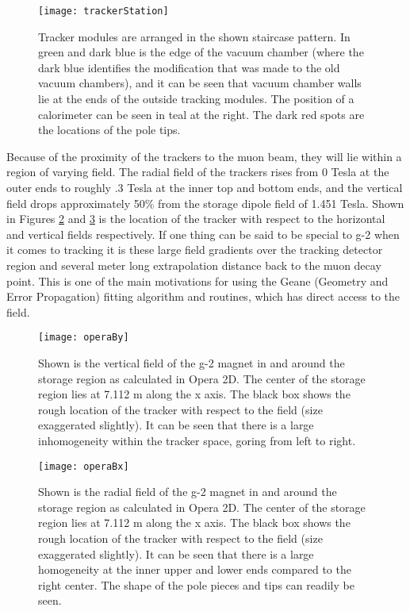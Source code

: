 \begin{figure}[]
\caption{Tracker modules are arranged in the shown staircase pattern. In green and dark blue is the edge of the vacuum chamber (where the dark blue identifies the modification that was made to the old vacuum chambers), and it can be seen that vacuum chamber walls lie at the ends of the outside tracking modules. The position of a calorimeter can be seen in teal at the right. The dark red spots are the locations of the pole tips.}
\centering
\texttt{[image: trackerStation]}
\label{fig:staircase}
\end{figure}


  Because of the proximity of the trackers to the muon beam, they will lie within a region of varying field. The radial field of the trackers rises from 0 Tesla at the outer ends to roughly .3 Tesla at the inner top and bottom ends, and the vertical field drops approximately 50\% from the storage dipole field of 1.451 Tesla. Shown in Figures \ref{fig:operaBy} and \ref{fig:operaBx} is the location of the tracker with respect to the horizontal and vertical fields respectively. If one thing can be said to be special to g-2 when it comes to tracking it is these large field gradients over the tracking detector region and several meter long extrapolation distance back to the muon decay point. This is one of the main motivations for using the Geane (Geometry and Error Propagation) fitting algorithm and routines, which has direct access to the field. 


\begin{figure}[]
\caption{Shown is the vertical field of the g-2 magnet in and around the storage region as calculated in Opera 2D. The center of the storage region lies at 7.112 m along the x axis. The black box shows the rough location of the tracker with respect to the field (size exaggerated slightly). It can be seen that there is a large inhomogeneity within the tracker space, goring from left to right.}
\centering
\texttt{[image: operaBy]}
\label{fig:operaBy}
\end{figure}

\begin{figure}[]
\caption{Shown is the radial field of the g-2 magnet in and around the storage region as calculated in Opera 2D. The center of the storage region lies at 7.112 m along the x axis. The black box shows the rough location of the tracker with respect to the field (size exaggerated slightly). It can be seen that there is a large homogeneity at the inner upper and lower ends compared to the right center. The shape of the pole pieces and tips can readily be seen.}
\centering
\texttt{[image: operaBx]}
\label{fig:operaBx}
\end{figure}


